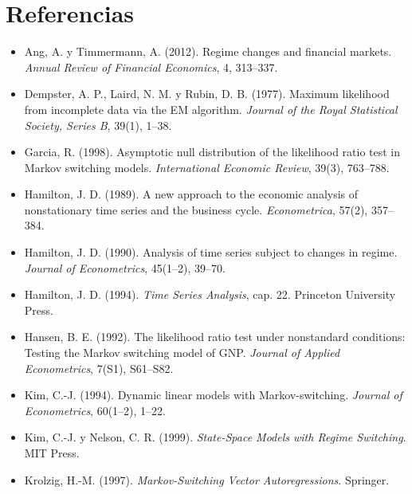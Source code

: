 \section*{Referencias}
\begin{itemize}[leftmargin=*]
  \item Ang, A. y Timmermann, A. (2012). Regime changes and financial markets. \emph{Annual Review of Financial Economics}, 4,
        313--337.
  \item Dempster, A. P., Laird, N. M. y Rubin, D. B. (1977). Maximum likelihood from incomplete data via the EM algorithm.
        \emph{Journal of the Royal Statistical Society, Series B}, 39(1), 1--38.
  \item Garcia, R. (1998). Asymptotic null distribution of the likelihood ratio test in Markov switching models.
        \emph{International Economic Review}, 39(3), 763--788.
  \item Hamilton, J. D. (1989). A new approach to the economic analysis of nonstationary time series and the business cycle.
        \emph{Econometrica}, 57(2), 357--384.
  \item Hamilton, J. D. (1990). Analysis of time series subject to changes in regime. \emph{Journal of Econometrics}, 45(1--2),
        39--70.
  \item Hamilton, J. D. (1994). \emph{Time Series Analysis}, cap. 22. Princeton University Press.
  \item Hansen, B. E. (1992). The likelihood ratio test under nonstandard conditions: Testing the Markov switching model of GNP.
        \emph{Journal of Applied Econometrics}, 7(S1), S61--S82.
  \item Kim, C.-J. (1994). Dynamic linear models with Markov-switching. \emph{Journal of Econometrics}, 60(1--2), 1--22.
  \item Kim, C.-J. y Nelson, C. R. (1999). \emph{State-Space Models with Regime Switching}. MIT Press.
  \item Krolzig, H.-M. (1997). \emph{Markov-Switching Vector Autoregressions}. Springer.
\end{itemize}
